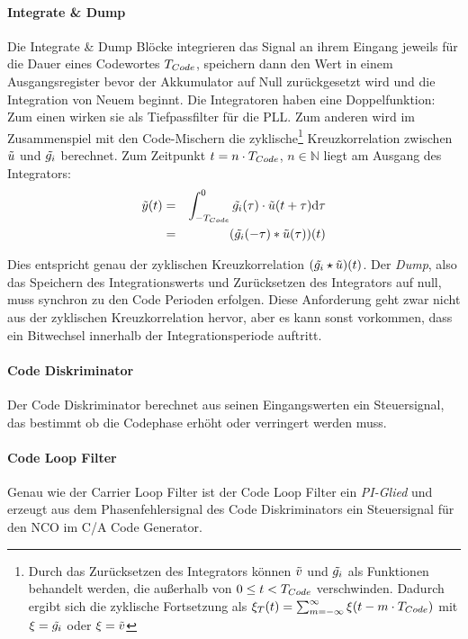 \paragraph{Integrate \& Dump} \label{IntegrateDump} Die Integrate \& Dump Blöcke integrieren das Signal an ihrem Eingang jeweils für die Dauer eines Codewortes ${T}_{Code}$, speichern dann den Wert in einem Ausgangsregister bevor der Akkumulator auf Null zurückgesetzt wird und die Integration von Neuem beginnt. Die Integratoren haben eine Doppelfunktion: Zum einen wirken sie als Tiefpassfilter für die PLL. Zum anderen wird im Zusammenspiel mit den Code-Mischern die zyklische\footnote{Durch das Zurücksetzen des Integrators können $\tilde{v}$ und $\tilde{g_i}$ als Funktionen behandelt werden, die außerhalb von $0\leq t < {T}_{Code}$ verschwinden. Dadurch ergibt sich die zyklische Fortsetzung als $\xi_T(t)=\sum_{m=-\infty}^{\infty}{\xi(t-m\cdot {T}_{Code})}$ mit $\xi=\tilde{g_i}$ oder $\xi=\tilde{v}$} Kreuzkorrelation zwischen $\tilde{u}$ und $\tilde{g_i}$ berechnet. Zum Zeitpunkt $t=n\cdot {T}_{Code}$, $n\in \mathbb{N}$ liegt am Ausgang des Integrators:
\begin{eqnarray}
	\tilde{y}(t) &=& \int_{-{T}_{Code}}^{0}{\tilde{g_i}(\tau) \cdot \tilde{u}(t+\tau) \textrm{d}\tau}\\
    &=& (\tilde{g_i}(-\tau) * \tilde{u}(\tau))(t)
\end{eqnarray}

Dies entspricht genau der zyklischen Kreuzkorrelation $(\tilde{g_i} \star \tilde{u})(t)$. Der \emph{Dump}, also das Speichern des Integrationswerts und Zurücksetzen des Integrators auf null, muss synchron zu den Code Perioden erfolgen. Diese Anforderung geht zwar nicht aus der zyklischen Kreuzkorrelation hervor, aber es kann sonst vorkommen, dass ein Bitwechsel innerhalb der Integrationsperiode auftritt.

\paragraph{Code Diskriminator} Der Code Diskriminator berechnet aus seinen Eingangswerten ein Steuersignal, das bestimmt ob die Codephase erhöht oder verringert werden muss.

\paragraph{Code Loop Filter} Genau wie der Carrier Loop Filter ist der Code Loop Filter ein \emph{PI-Glied} und erzeugt aus dem Phasenfehlersignal des Code Diskriminators ein Steuersignal für den NCO im C/A Code Generator.

